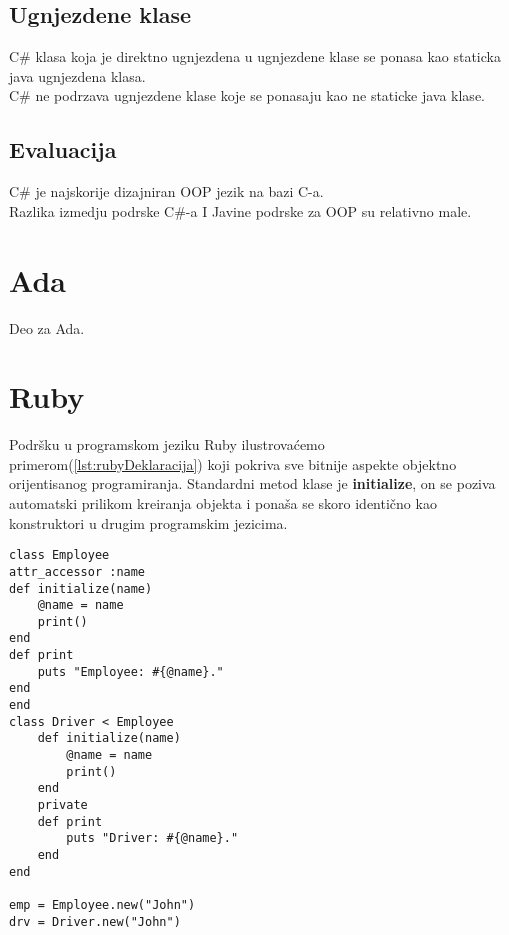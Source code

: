 \documentclass[a4paper]{article}
\begin{document}
\subsection{Ugnjezdene klase}
\label{subsec:csharpUgnjezdeneKlase}

C\# klasa koja je direktno ugnjezdena u ugnjezdene klase se ponasa kao staticka java ugnjezdena klasa.\\
C\# ne podrzava ugnjezdene klase koje se ponasaju kao ne staticke java klase.\\

\subsection{Evaluacija}
\label{subsec:csharpEvaluacija}

C\# je najskorije dizajniran OOP jezik na bazi C-a.\\
Razlika izmedju podrske C\#-a I Javine podrske za OOP su relativno male.\\

\section{Ada}
\label{sec:ada}
Deo za Ada.

\section{Ruby}
\label{sec:ruby}
 Podršku u programskom jeziku Ruby ilustrovaćemo primerom(\ref{lst:rubyDeklaracija}) koji pokriva sve bitnije aspekte objektno orijentisanog programiranja. Standardni metod klase je \textbf{initialize}, on se poziva automatski prilikom kreiranja objekta i ponaša se skoro identično kao konstruktori u drugim programskim jezicima.

\begin{lstlisting}[caption={Primer objektno orijentisanog programiranja u jeziku Ruby.},frame=single, label=lst:rubyDeklaracija]
class Employee
attr_accessor :name
def initialize(name)
	@name = name
	print()
end
def print
	puts "Employee: #{@name}."
end
end
class Driver < Employee
	def initialize(name)
		@name = name
		print()
	end
	private
	def print
		puts "Driver: #{@name}."
	end
end

emp = Employee.new("John")
drv = Driver.new("John")
\end{lstlisting}
\end{document}
